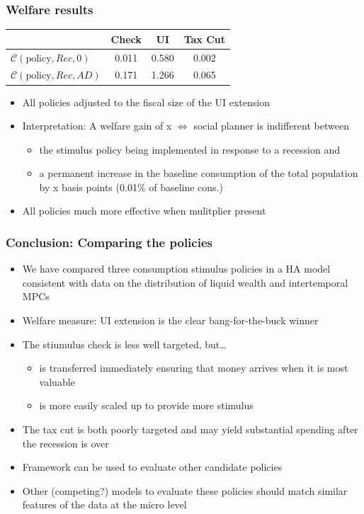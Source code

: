 \documentclass[pdflatex,aspectratio=169]{beamer}
\begin{document}
\begin{frame}
\frametitle{Welfare results}
\centering 
\begin{tabular}{@{}lccc@{}} 
	\toprule 
	& Check      & UI    & Tax Cut    \\  \midrule 
	$\mathcal{C}(\text{policy},Rec,0)$ & 0.011  & 0.580  & 0.002     \\ 
	$\mathcal{C}(\text{policy},Rec,AD)$ & 0.171  & 1.266  & 0.065     \\ 
\end{tabular}  
\medskip
\begin{itemize}
	\itemsep = .75\bigskipamount 
	\item All policies adjusted to the fiscal size of the UI extension
	\item Interpretation: A welfare gain of x $\Leftrightarrow$ social planner is indifferent between 
	\begin{itemize}
		\itemsep = .25\bigskipamount 
		\item the stimulus policy being implemented in response to a recession and 
		\item a permanent increase in the baseline consumption of the total population by x basis points (0.01\% of baseline cons.)
	\end{itemize}
		\item All policies much more effective when mulitplier present
\end{itemize}
\end{frame}




\begin{frame}
\frametitle{Conclusion: Comparing the policies}
\begin{itemize}
\itemsep = .5\bigskipamount 
\item We have compared three consumption stimulus policies in a HA model consistent with data on the distribution of liquid wealth and intertemporal MPCs 
\item Welfare measure: UI extension is the clear bang-for-the-buck winner 
\item The stiumulus check is less well targeted, but\ldots 
	\begin{itemize}
		\itemsep = .25\bigskipamount 
		\item is transferred immediately ensuring that money arrives when it is most valuable 
		\item is more easily scaled up to provide more stimulus 
	\end{itemize}
\item The tax cut is both poorly targeted and may yield substantial spending after the recession is over 
\item Framework can be used to evaluate other candidate policies 
\item Other (competing?) models to evaluate these policies should match similar features of the data at the micro level 

\end{itemize}

\end{frame}
\end{document}
